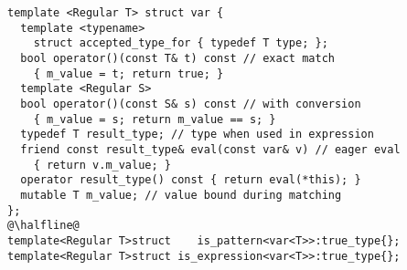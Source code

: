 \begin{lstlisting}[keepspaces]
template <Regular T> struct var {
  template <typename> 
    struct accepted_type_for { typedef T type; };
  bool operator()(const T& t) const // exact match
    { m_value = t; return true; }
  template <Regular S> 
  bool operator()(const S& s) const // with conversion
    { m_value = s; return m_value == s; }
  typedef T result_type; // type when used in expression
  friend const result_type& eval(const var& v) // eager eval
    { return v.m_value; }
  operator result_type() const { return eval(*this); }
  mutable T m_value; // value bound during matching
};
@\halfline@
template<Regular T>struct    is_pattern<var<T>>:true_type{};
template<Regular T>struct is_expression<var<T>>:true_type{};
\end{lstlisting}

%

